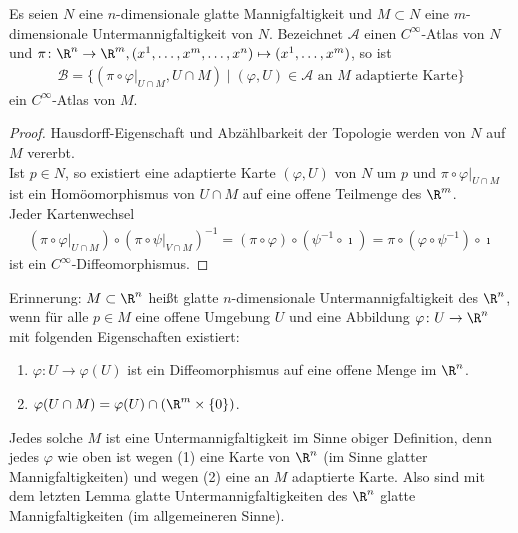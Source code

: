 \begin{lemma}
  Es seien $N$ eine $n$-dimensionale glatte Mannigfaltigkeit und $M \subset N$ eine $m$-dimensionale Untermannigfaltigkeit von $N$. Bezeichnet $\mathcal A$ einen $C^{\infty}$-Atlas von $N$ und $\pi \colon \R^n \to \R^m, (x^1, \ldots, x^m,\ldots,x^n) \mapsto (x^1, \ldots, x^m)$, so ist
  \begin{align*}
    \mathcal B = \{(\pi \circ \varphi|_{U \cap M},U\cap M) \mid (\varphi, U) \in \mathcal A \text{ an } M \text{ adaptierte Karte}\}
  \end{align*}
  ein $C^{\infty}$-Atlas von $M$.
\end{lemma}

\begin{proof}
  Hausdorff-Eigenschaft und Abzählbarkeit der Topologie werden von $N$ auf $M$ vererbt.\\
  Ist $p \in N$, so existiert eine adaptierte Karte $(\varphi,U)$ von $N$ um $p$ und $\pi \circ \varphi|_{U \cap M}$ ist ein Homöomorphismus von $U \cap M$ auf eine offene Teilmenge des $\R^m$.\\
  Jeder Kartenwechsel
  \begin{align*}
    (\pi \circ \varphi|_{U \cap M}) \circ (\pi \circ \psi|_{V \cap M})^{-1} = (\pi \circ \varphi) \circ (\psi^{-1} \circ \imath) = \pi \circ (\varphi \circ \psi^{-1}) \circ \imath
  \end{align*}
  ist ein $C^{\infty}$-Diffeomorphismus.
\end{proof}

\begin{bem}
  Erinnerung: $M \subset \R^n$ heißt glatte $n$-dimensionale Untermannigfaltigkeit des $\R^n$, wenn für alle $p \in M$ eine offene Umgebung $U$ und eine Abbildung $\varphi \colon U \to \R^n$  mit folgenden Eigenschaften existiert:
  \begin{enumerate}
  \item $\varphi \colon U \to \varphi(U)$ ist ein Diffeomorphismus auf eine offene Menge im $\R^{n}$.
  \item $\varphi(U \cap M) = \varphi(U) \cap (\R^{m} \times \{0\})$.
  \end{enumerate}
Jedes solche $M$ ist eine Untermannigfaltigkeit im Sinne obiger Definition, denn jedes $\varphi$ wie oben ist wegen (1) eine Karte von $\R^n$ (im Sinne glatter Mannigfaltigkeiten) und wegen (2) eine an $M$ adaptierte Karte. Also sind mit dem letzten Lemma glatte Untermannigfaltigkeiten des $\R^n$ glatte Mannigfaltigkeiten (im allgemeineren Sinne).
\end{bem}



